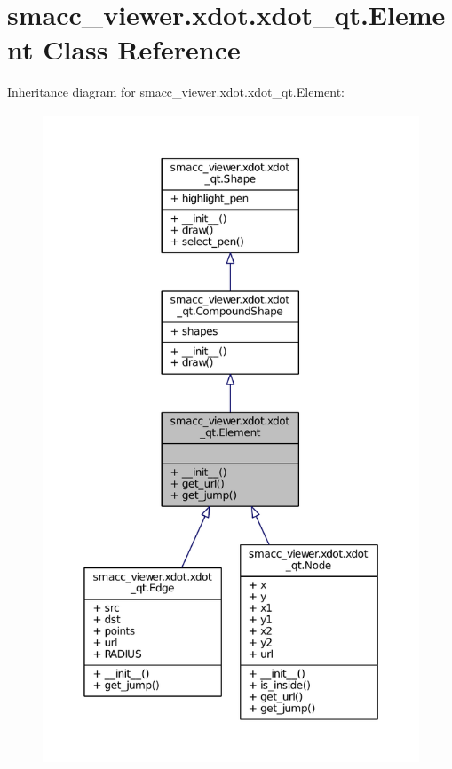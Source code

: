 \hypertarget{classsmacc__viewer_1_1xdot_1_1xdot__qt_1_1Element}{}\section{smacc\+\_\+viewer.\+xdot.\+xdot\+\_\+qt.\+Element Class Reference}
\label{classsmacc__viewer_1_1xdot_1_1xdot__qt_1_1Element}


Inheritance diagram for smacc\+\_\+viewer.\+xdot.\+xdot\+\_\+qt.\+Element\+:
\nopagebreak
\begin{figure}[H]
\begin{center}
\leavevmode
\includegraphics[height=550pt]{classsmacc__viewer_1_1xdot_1_1xdot__qt_1_1Element__inherit__graph}
\end{center}
\end{figure}



